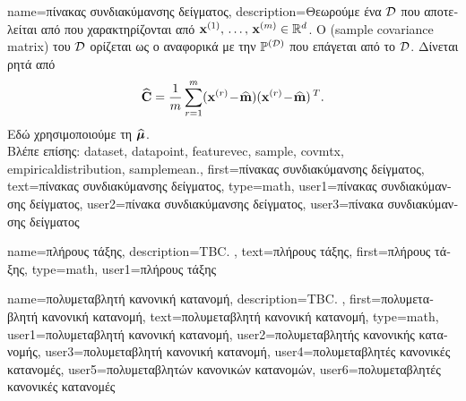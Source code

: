 {name={\foreignlanguage{greek}{πίνακας συνδιακύμανσης δείγματος}}, 
	description={\foreignlanguage{greek}{Θεωρούμε ένα}  $\mathcal{D}$ \foreignlanguage{greek}{που αποτελείται από} 
		 \foreignlanguage{greek}{που χαρακτηρίζονται από}  
		${\bf x}^{(1)}, \,\ldots, \,{\bf x}^{(m)} \in \mathbb{R}^{d}$.	
		\foreignlanguage{greek}{Ο}  
		 (sample covariance matrix) \foreignlanguage{greek}{του} $\mathcal{D}$ \foreignlanguage{greek}{ορίζεται ως ο} 
		 \foreignlanguage{greek}{αναφορικά με την}  $\mathbb{P}^{(\mathcal{D})}$ 
		\foreignlanguage{greek}{που επάγεται από το $\mathcal{D}$. Δίνεται ρητά από} 
		$$\widehat{{\bf C}} = \frac{1}{m} \sum_{r=1}^{m} ({\bf x}^{(r)}\!-\!\widehat{{\bf m}}) ({\bf x}^{(r)}\!-\!\widehat{{\bf m}})\,^{T}.$$ 
		\foreignlanguage{greek}{Εδώ χρησιμοποιούμε τη}  $\widehat{\bm \mu}$. 
		\\
		\foreignlanguage{greek}{Βλέπε επίσης:} \gls{dataset}, \gls{datapoint}, \gls{featurevec}, \gls{sample}, \gls{covmtx},
		\gls{empiricaldistribution}, \gls{samplemean}.},
	first={\foreignlanguage{greek}{πίνακας συνδιακύμανσης δείγματος}},
	text={\foreignlanguage{greek}{πίνακας συνδιακύμανσης δείγματος}},
	type=math,
	user1={\foreignlanguage{greek}{πίνακας συνδιακύμανσης δείγματος}}, %
	user2={\foreignlanguage{greek}{πίνακα συνδιακύμανσης δείγματος}}, %
	user3={\foreignlanguage{greek}{πίνακα συνδιακύμανσης δείγματος}} %
}

{name={\foreignlanguage{greek}{πλήρους τάξης}},
 	description={TBC. }, 
	text={\foreignlanguage{greek}{πλήρους τάξης}},
  	first={\foreignlanguage{greek}{πλήρους τάξης}},
	type=math,
	user1={\foreignlanguage{greek}{πλήρους τάξης}} %
}

{name={\foreignlanguage{greek}{πολυμεταβλητή κανονική κατανομή}}, 
	description={TBC. }, 
	first={\foreignlanguage{greek}{πολυμεταβλητή κανονική κατανομή}},
	text={\foreignlanguage{greek}{πολυμεταβλητή κανονική κατανομή}},
	type=math,
	user1={\foreignlanguage{greek}{πολυμεταβλητή κανονική κατανομή}}, %
	user2={\foreignlanguage{greek}{πολυμεταβλητής κανονικής κατανομής}}, %
	user3={\foreignlanguage{greek}{πολυμεταβλητή κανονική κατανομή}}, %
	user4={\foreignlanguage{greek}{πολυμεταβλητές κανονικές κατανομές}}, %
	user5={\foreignlanguage{greek}{πολυμεταβλητών κανονικών κατανομών}}, %
	user6={\foreignlanguage{greek}{πολυμεταβλητές κανονικές κατανομές}} %
}


